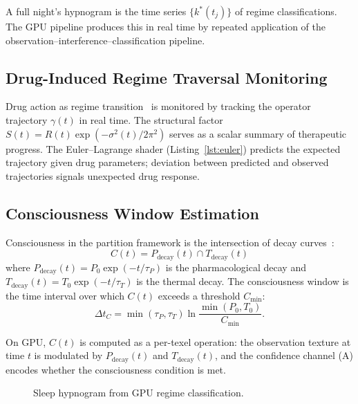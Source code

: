\documentclass[11pt,twocolumn,a4paper]{article}
\begin{document}
A full night's hypnogram is the time series $\{k^*(t_j)\}$ of regime classifications.
The GPU pipeline produces this in real time by repeated application of the observation--interference--classification pipeline.

\subsection{Drug-Induced Regime Traversal Monitoring}

Drug action as regime transition~\cite{sachikonye2026aperture,cipriani2018} is monitored by tracking the operator trajectory $\gamma(t)$ in real time.
The structural factor $S(t) = R(t) \exp(-\sigma^2(t)/2\pi^2)$ serves as a scalar summary of therapeutic progress.
The Euler--Lagrange shader (Listing~\ref{lst:euler}) predicts the expected trajectory given drug parameters; deviation between predicted and observed trajectories signals unexpected drug response.

\subsection{Consciousness Window Estimation}

Consciousness in the partition framework is the intersection of decay curves~\cite{sachikonye2026operator}:
\begin{equation}
\boxed{C(t) = P_{\mathrm{decay}}(t) \cap T_{\mathrm{decay}}(t)}
\label{eq:consciousness}
\end{equation}
where $P_{\mathrm{decay}}(t) = P_0 \exp(-t/\tau_P)$ is the pharmacological decay and $T_{\mathrm{decay}}(t) = T_0 \exp(-t/\tau_T)$ is the thermal decay.
The consciousness window is the time interval over which $C(t)$ exceeds a threshold $C_{\min}$:
\begin{equation}
\Delta t_C = \min(\tau_P, \tau_T) \ln\!\frac{\min(P_0, T_0)}{C_{\min}}.
\label{eq:consciousness-window}
\end{equation}

On GPU, $C(t)$ is computed as a per-texel operation: the observation texture at time $t$ is modulated by $P_{\mathrm{decay}}(t)$ and $T_{\mathrm{decay}}(t)$, and the confidence channel (A) encodes whether the consciousness condition is met.

\begin{figure}[t]
\centering
{}
\caption{Sleep hypnogram from GPU regime classification.}
\label{fig:sleep}
\end{figure}
\end{document}
